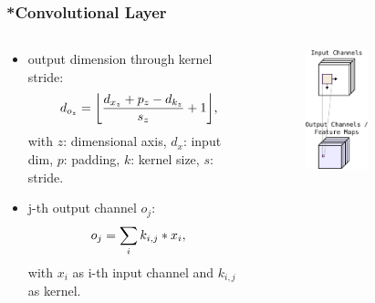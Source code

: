 \begin{frame}
  \frametitle{*Convolutional Layer}
  \vspace{-0.5cm}
  \begin{columns}
    \begin{column}{0.6\textwidth}
      \begin{itemize}
        \item output dimension through kernel stride:
        \begin{equation*}\label{eq:nn_theory_cnn_dim}
        d_{o_z} = \floor*{\frac{d_{x_z} + p_z - d_{k_z}}{s_z} + 1},
        \end{equation*}
        {\footnotesize
        with $z$: dimensional axis, $d_{x}$: input dim, $p$: padding, $k$: kernel size, $s$: stride}.
        \item j-th output channel $o_j$:
        \begin{equation*}
          \footnotesize
          o_j = \sum_{i} k_{i, j} \ast x_i,
        \end{equation*}
        \footnotesize
        with $x_i$ as i-th input channel and $k_{i, j}$ as kernel.   
      \end{itemize}
    \end{column}
    \begin{column}{0.4\textwidth}
      \vspace{1cm}
      \begin{figure} \includegraphics[width=0.5\textwidth]{./figs/nn_theory_cnn_scheme.pdf} \end{figure}
    \end{column}
  \end{columns}
\end{frame}

